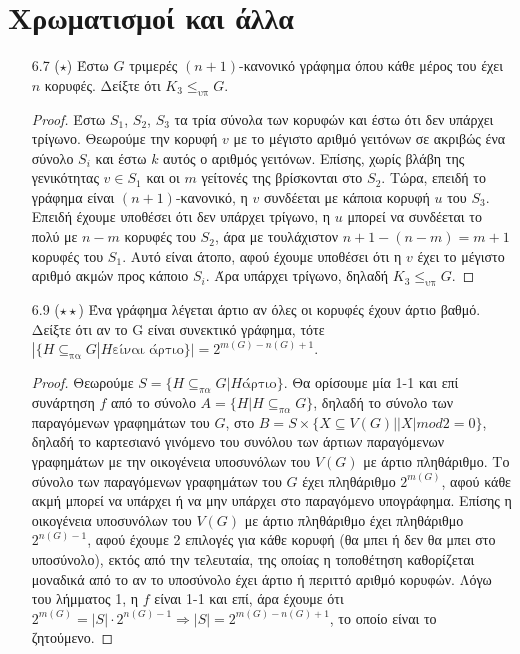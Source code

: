 \documentclass[a4paper, oneside, 11pt]{article}
\theoremstyle{definition}
\begin{document}
\begin{enumerate}
\end{enumerate}

\section{Χρωματισμοί και άλλα}
\begin{enumerate}

\item[6.7 ($\star$)]
Έστω $G$ τριμερές $(n+1)$-κανονικό γράφημα όπου κάθε μέρος του έχει $n$ κορυφές. Δείξτε ότι $K_3 \leq_{\text{υπ}} G$.

\begin{proof}
Έστω $S_1$, $S_2$, $S_3$ τα τρία σύνολα των κορυφών και έστω ότι δεν υπάρχει τρίγωνο. Θεωρούμε την κορυφή $v$ με το μέγιστο αριθμό γειτόνων σε ακριβώς ένα σύνολο $S_i$ και έστω $k$ αυτός ο αριθμός γειτόνων.
Επίσης, χωρίς βλάβη της γενικότητας $v\in S_1$ και οι $m$ γείτονές της βρίσκονται στο $S_2$. Τώρα, επειδή το γράφημα είναι $(n+1)$-κανονικό, η $v$ συνδέεται με κάποια κορυφή $u$ του $S_3$. Επειδή έχουμε
υποθέσει ότι δεν υπάρχει τρίγωνο, η $u$ μπορεί να συνδέεται το πολύ με $n-m$ κορυφές του $S_2$, άρα με τουλάχιστον $n+1-(n-m)=m+1$ κορυφές του $S_1$. Αυτό είναι άτοπο, αφού έχουμε υποθέσει ότι η $v$ έχει
το μέγιστο αριθμό ακμών προς κάποιο $S_i$. Άρα υπάρχει τρίγωνο, δηλαδή $K_3 \leq_{\text{υπ}} G$.
\end{proof}

\item[6.9 ($\star\star$)]
   Ένα γράφημα λέγεται άρτιο αν όλες οι κορυφές έχουν άρτιο βαθμό. Δείξτε ότι αν το G είναι συνεκτικό γράφημα, τότε 
   $|\{H\subseteq_{\text{πα}} G | H \text{είναι άρτιο}\}| = 2^{m(G)-n(G)+1}$.

   \begin{proof}
Θεωρούμε $S = \{H\subseteq_{\pi \alpha} G | H \text{άρτιο}\}$.
     Θα ορίσουμε μία 1-1 και επί συνάρτηση $f$ από το σύνολο 
$A = \{H | H\subseteq_{\pi\alpha} G\}$, δηλαδή το σύνολο των παραγόμενων γραφημάτων 
του $G$, στο $B = S\times \{X\subseteq V(G) | |X| mod 2 = 0\}$, 
δηλαδή το καρτεσιανό γινόμενο του συνόλου των άρτιων παραγόμενων γραφημάτων 
με την οικογένεια υποσυνόλων του $V(G)$ με άρτιο πληθάριθμο. Το σύνολο των 
παραγόμενων γραφημάτων του $G$ έχει πληθάριθμο $2^{m(G)}$, αφού κάθε ακμή 
μπορεί να υπάρχει ή να μην υπάρχει στο παραγόμενο υπογράφημα. 
Επίσης η οικογένεια υποσυνόλων του $V(G)$ με άρτιο πληθάριθμο έχει πληθάριθμο 
$2^{n(G)-1}$, αφού έχουμε 2 επιλογές για κάθε κορυφή (θα μπει ή δεν θα μπει 
στο υποσύνολο), εκτός από την τελευταία, της οποίας η τοποθέτηση καθορίζεται 
μοναδικά από το αν το υποσύνολο έχει άρτιο ή περιττό αριθμό κορυφών. Λόγω 
του λήμματος 1, η $f$ είναι 1-1 και επί, άρα έχουμε ότι 
$2^{m(G)} = |S| \cdot 2^{n(G)-1} \Rightarrow |S| = 2^{m(G)-n(G)+1}$, το οποίο 
είναι το ζητούμενο.
   \end{proof}



\end{enumerate}
\end{document}
